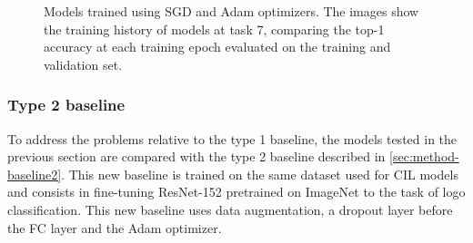 \begin{figure}[H]
	\centering
    \qquad
	\caption{Models trained using SGD and Adam optimizers. The images show the training history of models at task 7, comparing the top-1 accuracy at each training epoch evaluated on the training and validation set.}%
	\label{fig:exp4-train_val}%
\end{figure}

\newpage


\newpage
\subsubsection{Type 2 baseline}
\label{sec:exp-baseline2}
To address the problems relative to the type 1 baseline, the models tested in the previous section are compared with the type 2 baseline described in \autoref{sec:method-baseline2}.
This new baseline is trained on the same dataset used for CIL models and consists in fine-tuning ResNet-152 pretrained on ImageNet to the task of logo classification. This new baseline uses data augmentation, a dropout layer before the FC layer and the Adam optimizer.

